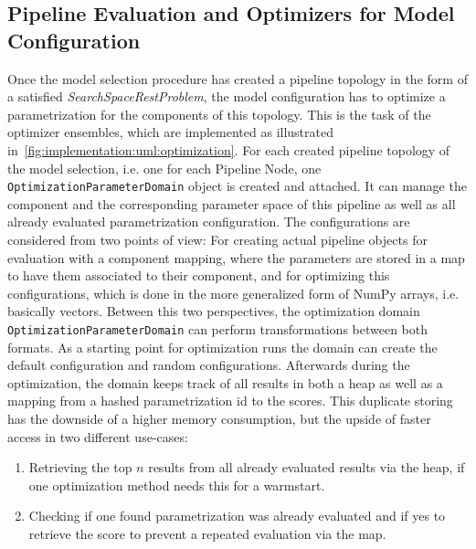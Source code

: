 \subsection{Pipeline Evaluation and Optimizers for Model Configuration}
\label{sec:implementation:components:optimization}
Once the model selection procedure has created a pipeline topology in the form of a satisfied \textit{SearchSpaceRestProblem}, the model configuration has to optimize a parametrization for the components of this topology.
This is the task of the optimizer ensembles, which are implemented as illustrated in~\ref{fig:implementation:uml:optimization}.\newline
For each created pipeline topology of the model selection, i.e. one for each Pipeline Node, one \texttt{OptimizationParameterDomain} object is created and attached.
It can manage the component and the corresponding parameter space of this pipeline as well as all already evaluated parametrization configuration.
The configurations are considered from two points of view: For creating actual pipeline objects for evaluation with a component mapping, where the parameters are stored in a map to have them associated to their component, and for optimizing this configurations, which is done in the more generalized form of NumPy arrays, i.e. basically vectors.
Between this two perspectives, the optimization domain \texttt{OptimizationParameterDomain} can perform transformations between both formats.\newline
As a starting point for optimization runs the domain can create the default configuration and random configurations.
Afterwards during the optimization, the domain keeps track of all results in both a heap as well as a mapping from a hashed parametrization id to the scores.
This duplicate storing has the downside of a higher memory consumption, but the upside of faster access in two different use-cases:
\begin{enumerate}
    \item Retrieving the top $n$ results from all already evaluated results via the heap, if one optimization method needs this for a warmstart.
    \item Checking if one found parametrization was already evaluated and if yes to retrieve the score to prevent a repeated evaluation via the map.
\end{enumerate}

